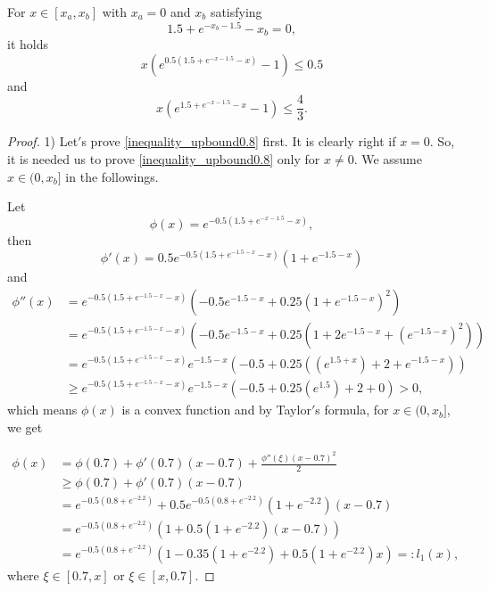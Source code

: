 \documentclass{HZNUMCM}
\begin{document}
\begin{lemma}\label{upbound0.8}
For  $x \in [x_a,x_b]$  with $x_a=0$ and $x_b$ satisfying
\begin{equation*}
1.5 + e^{-x_b-1.5} - x_b=0,
\end{equation*}
 it holds
\begin{equation}\label{inequality_upbound0.8}
x (e^{0.5 (1.5 + e^{-x-1.5} - x)}-1)\leqslant0.5
\end{equation}
and
\begin{equation}\label{inequality_upbound1.31}
x (e^{ 1.5 + e^{-x-1.5} - x}-1)\leqslant  \frac{4}3.
\end{equation}
\end{lemma}
\begin{proof}
1) Let$'$s prove \eqref{inequality_upbound0.8} first. It is clearly right if $x=0$. So, it is needed us to prove \eqref{inequality_upbound0.8} only for $x\neq 0$. We assume $x\in(0,x_b]$ in the followings.

Let $$\phi(x)=e^{-0.5(1.5 + e^{-x-1.5} - x)},$$
then $$\phi'(x)=0.5 e^{-0.5 \left(1.5 +e^{-1.5-x}-x\right)} \left(1+e^{-1.5-x}\right)
$$
and
\begin{align*}
\phi''(x)&=e^{-0.5 \left(1.5 +e^{-1.5-x}-x\right)} (-0.5 e^{-1.5-x}+0.25 \left(1+e^{-1.5-x}\right)^2)\\
        &= e^{-0.5 \left(1.5 +e^{-1.5-x}-x\right)}(-0.5 e^{-1.5-x}+0.25(1+2 e^{-1.5-x}+( e^{-1.5-x})^2))\\
        &=e^{-0.5 \left(1.5 +e^{-1.5-x}-x\right)}e^{-1.5-x}(-0.5+0.25((e^{1.5+x})+2 +e^{-1.5-x}))\\
        &\geqslant e^{-0.5 \left(1.5 +e^{-1.5-x}-x\right)}e^{-1.5-x}(-0.5+0.25(e^{1.5})+2+0)> 0,
\end{align*}which means $\phi(x)$ is a convex function and by Taylor$'$s formula, for $x\in(0,x_b]$, we get

\begin{equation}\label{l1}
\begin{split}
\phi(x)&= \phi(0.7)+\phi'(0.7)(x-0.7)+\frac{\phi''(\xi)(x-0.7)^2}2\\
&\geqslant \phi(0.7)+\phi'(0.7)(x-0.7)\\
&=e^{-0.5(0.8 + e^{-2.2} )}+0.5 e^{-0.5 \left(0.8 +e^{-2.2}\right)} \left(1+e^{-2.2}\right)(x-0.7)\\
&=e^{-0.5(0.8 + e^{-2.2} )}(1+0.5 \left(1+e^{-2.2}\right)(x-0.7))\\
&=e^{-0.5(0.8 + e^{-2.2} )}(1-0.35 \left(1+e^{-2.2}\right)+0.5 \left(1+e^{-2.2}\right)x)=:l_1(x),
\end{split}
\end{equation}where $\xi\in[0.7,x] \text{~or~} \xi\in[x,0.7]$.


\end{proof}
\end{document}
